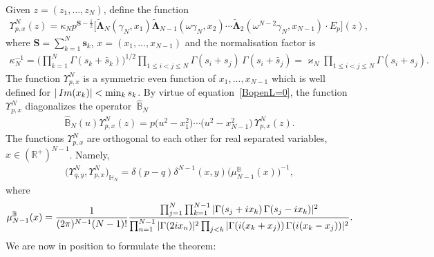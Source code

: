 \documentclass[11pt]{article}
\numberwithin{equation}{section}
\numberwithin{equation}{section}
\begin{document}
Given $ z=(z_1,\dots, z_{N})$, define the function
\begin{gather*}%
\Upsilon^N_{p,{x}}( z) = \kappa_N p^{\boldsymbol S-\frac12}
 \Big[ \widetilde{\boldsymbol\Lambda}_N(\gamma_N, x_1)
 \widetilde{\boldsymbol\Lambda}_{N-1}(\omega\gamma_N, x_2)\cdots \widetilde{\boldsymbol\Lambda}_2(\omega^{N-2}\gamma_N, x_{N-1})
 \cdot E_p \Big]( z),
\end{gather*}
where $\boldsymbol S=\sum_{k=1}^N \boldsymbol s_k$, $x=(x_1,\dots,x_{N-1})$ and the normalisation factor is
\begin{gather*}
\kappa_N^{-1}=\bigg(\prod_{k=1}^N\Gamma(s_k+\bar s_k)\bigg)^{1/2} \prod_{1\leq i<j\leq N}\Gamma(s_i+s_j)\,\Gamma(s_i+\bar s_j)=
\varkappa_N \prod_{1\leq i<j\leq N}\Gamma(s_i+s_j).
\end{gather*}
The function $\Upsilon^N_{p, x}$ is a symmetric even function of $x_1,\dots,x_{N-1}$
which is well defined for $|\mathop{\rm Im}(x_k)|\allowbreak <\min_k s_k$.
By virtue of equation~\eqref{BopenL=0}, the function $\Upsilon^N_{p,{x}}$ diagonalizes the operator~$\widehat{\mathbb B}_N$
\begin{gather*}
\widehat{\mathbb B}_N(u)\Upsilon^N_{p,{x}}( z) = p
\big(u^2-x_1^2\big)\cdots \big(u^2-x_{N-1}^2\big)\,\Upsilon^N_{p,{x}}( z).
\end{gather*}
The functions $\Upsilon^N_{p, x}$ are orthogonal to each other for real separated variables, $ x \in (\mathbb{R}^+)^{N-1}$. Namely,
\begin{gather*}
\big(\Upsilon^N_{q,{y}},\Upsilon^N_{p,{x}}\big)_{\mathbb H_N} =
 \delta(p-q)\delta^{N-1}( x,y) \big(\mu_{N-1}^{\mathbb B}( x)\big)^{-1},
\end{gather*}
where
\begin{gather*}%
\mu_{N-1}^{\mathbb B}(x)=\frac1{(2\pi)^{N-1}(N-1)!}
\frac {\prod_{j=1}^N\prod_{k=1}^{N-1}|\Gamma(s_j +{\rm i}x_k)\,\Gamma(s_j -{\rm i}x_k)|^{2}}
{\prod_{n=1}^{N-1}|\Gamma(2{\rm i}x_n)|^2\prod_{j< k}
|\Gamma({\rm i}(x_k + x_j))\,\Gamma({\rm i}(x_k - x_j))|^2 }.
\end{gather*}
We are now in position to formulate the theorem:
\end{document}
